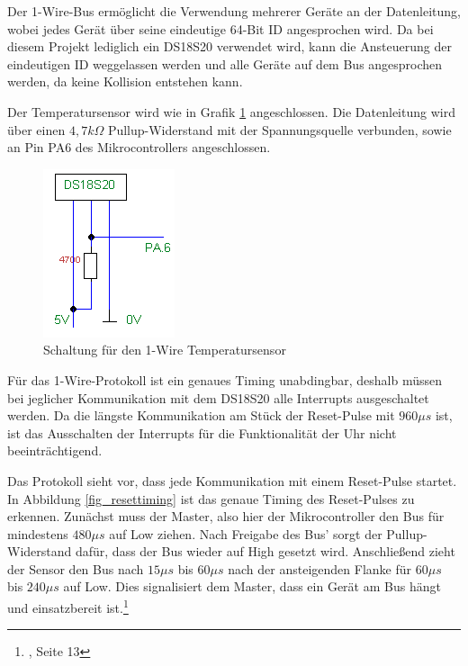 Der 1-Wire-Bus ermöglicht die Verwendung mehrerer Geräte an der Datenleitung, wobei jedes Gerät über seine eindeutige 64-Bit ID angesprochen wird. Da bei diesem Projekt lediglich ein DS18S20 verwendet wird, kann die Ansteuerung der eindeutigen ID weggelassen werden und alle Geräte auf dem Bus angesprochen werden, da keine Kollision entstehen kann.

Der Temperatursensor wird wie in Grafik \ref{fig_tempsensor} angeschlossen. Die Datenleitung wird über einen $4,7 k\Omega$ Pullup-Widerstand mit der Spannungsquelle verbunden, sowie an Pin PA6 des Mikrocontrollers angeschlossen.
%
\begin{figure}[htp]
\centering
\includegraphics{skizzen/temperatursensor_schematic.png}
\caption{Schaltung für den 1-Wire Temperatursensor}\label{fig_tempsensor}
\end{figure}
%
Für das 1-Wire-Protokoll ist ein genaues Timing unabdingbar, deshalb müssen bei jeglicher Kommunikation mit dem DS18S20 alle Interrupts ausgeschaltet werden. Da die längste Kommunikation am Stück der Reset-Pulse mit $960 \mu s$ ist, ist das Ausschalten der Interrupts für die Funktionalität der Uhr nicht beeinträchtigend.

Das Protokoll sieht vor, dass jede Kommunikation mit einem Reset-Pulse startet. In Abbildung \ref{fig_resettiming} 
ist das genaue Timing des Reset-Pulses zu erkennen. Zunächst muss der Master, also hier der Mikrocontroller den Bus für mindestens $480 \mu s$ auf Low ziehen. Nach Freigabe des Bus' sorgt der Pullup-Widerstand dafür, dass der Bus wieder auf High gesetzt wird. Anschließend zieht der Sensor den Bus nach $15 \mu s$ bis $60 \mu s$ nach der ansteigenden Flanke für $60 \mu s$ bis $240 \mu s$ auf Low. Dies signalisiert dem Master, dass ein Gerät am Bus hängt und einsatzbereit ist.\footnote{\cite{ds18s20}, Seite 13}

